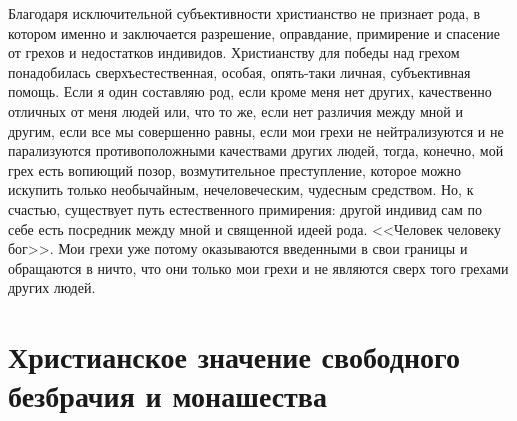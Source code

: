 \documentclass[12pt,oneside]{book}
\begin{document}
Благодаря исключительной субъективности христианство не признает рода, в котором именно и заключается разрешение, оправдание, примирение и спасение от грехов и недостатков индивидов. Христианству для победы над грехом понадобилась сверхъестественная, особая, опять-таки личная, субъективная помощь. Если я один составляю род, если кроме меня нет других, качественно отличных от меня людей или, что то же, если нет различия между мной и другим, если все мы совершенно равны, если мои грехи не нейтрализуются и не парализуются противоположными качествами других людей, тогда, конечно, мой грех есть вопиющий позор, возмутительное преступление, которое можно искупить только необычайным, нечеловеческим, чудесным средством. Но, к счастью, существует путь естественного примирения: другой индивид сам по себе есть посредник между мной и священной идеей рода. <<Человек человеку бог>>. Мои грехи уже потому оказываются введенными в свои границы и обращаются в ничто, что они только мои грехи и не являются сверх того грехами других людей.





\chapter{Христианское значение свободного безбрачия и монашества}
\end{document}
